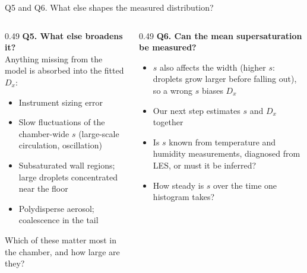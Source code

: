 \documentclass[aspectratio=169,10pt]{beamer}
\newcommand{\ask}[1]{\textcolor{askcol}{\textbf{#1}}}
\begin{document}
\begin{frame}{Q5 and Q6. What else shapes the measured distribution?}
\begin{columns}[T]
\begin{column}{0.49\textwidth}
\ask{Q5. What else broadens it?}\\[0.3em]
Anything missing from the model is absorbed into the fitted $D_x$:
\begin{itemize}
\item Instrument sizing error
\item Slow fluctuations of the chamber-wide $s$ (large-scale circulation, oscillation)
\item Subsaturated wall regions; large droplets concentrated near the floor
\item Polydisperse aerosol; coalescence in the tail
\end{itemize}
Which of these matter most in the chamber, and how large are they?
\end{column}
\begin{column}{0.49\textwidth}
\ask{Q6. Can the mean supersaturation be measured?}\\[0.3em]
\begin{itemize}
\item $s$ also affects the width (higher $s$: droplets grow larger before falling out), so a wrong $s$ biases $D_x$
\item Our next step estimates $s$ and $D_x$ together
\item Is $s$ known from temperature and humidity measurements, diagnosed from LES, or must it be inferred?
\item How steady is $s$ over the time one histogram takes?
\end{itemize}
\end{column}
\end{columns}
\end{frame}
\end{document}
